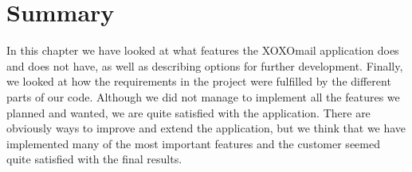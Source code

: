 \section{Summary}\label{con_summary}

In this chapter we have looked at what features the XOXOmail application does and does not have, as well as describing options for further development. Finally, we looked at how the requirements in the project were fulfilled by the different parts of our code.
\newline
\newline
Although we did not manage to implement all the features we planned and wanted, we are quite satisfied with the application. There are obviously ways to improve and extend the application, but we think that we have implemented many of the most important features and the customer seemed quite satisfied with the final results. 